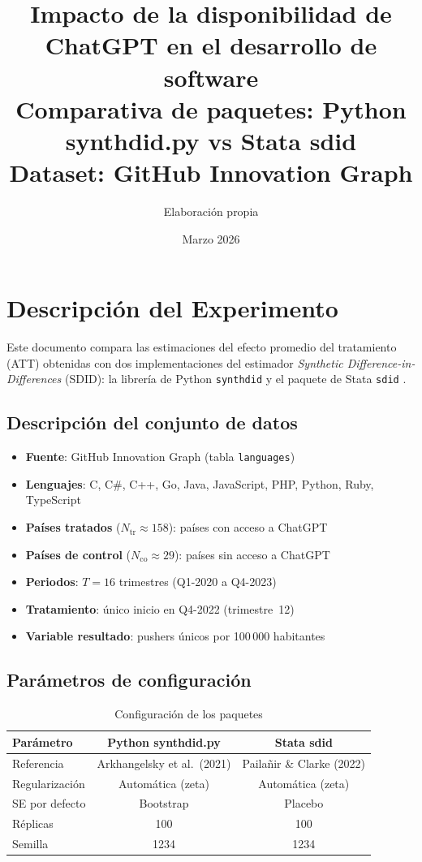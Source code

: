 \documentclass[12pt,a4paper]{article}
\title{\textbf{Impacto de la disponibilidad de ChatGPT en el desarrollo de software}\\[0.5em]
\large Comparativa de paquetes: \textcolor{pyblue}{Python synthdid.py} vs \textcolor{statagreen}{Stata sdid}\\[0.4em]
\normalsize Dataset: GitHub Innovation Graph}
\author{Elaboraci\'on propia}
\date{Marzo 2026}
\begin{document}
\maketitle
\thispagestyle{empty}
\tableofcontents
\newpage

\section{Descripci\'on del Experimento}

Este documento compara las estimaciones del efecto promedio del tratamiento (ATT)
obtenidas con dos implementaciones del estimador \textit{Synthetic Difference-in-Differences}
(SDID): la librer\'ia de Python \texttt{synthdid} \cite{clarke2023} y el paquete de Stata
\texttt{sdid} \cite{pailanir2022}.

\subsection*{Descripci\'on del conjunto de datos}
\begin{itemize}
  \item \textbf{Fuente}: GitHub Innovation Graph (tabla \texttt{languages})
  \item \textbf{Lenguajes}: C, C\#, C++, Go, Java, JavaScript, PHP, Python, Ruby, TypeScript
  \item \textbf{Pa\'ises tratados} ($N_{\mathrm{tr}} \approx 158$): pa\'ises con acceso a ChatGPT
  \item \textbf{Pa\'ises de control} ($N_{\mathrm{co}} \approx 29$): pa\'ises sin acceso a ChatGPT
  \item \textbf{Periodos}: $T = 16$ trimestres (Q1-2020 a Q4-2023)
  \item \textbf{Tratamiento}: \'unico inicio en Q4-2022 (trimestre~12)
  \item \textbf{Variable resultado}: pushers \'unicos por 100\,000 habitantes
\end{itemize}

\subsection*{Par\'ametros de configuraci\'on}
\begin{table}[htbp]\centering
\caption{Configuraci\'on de los paquetes}
\begin{tabular}{lcc}
\toprule
Par\'ametro & \textcolor{pyblue}{Python synthdid.py} & \textcolor{statagreen}{Stata sdid} \\
\midrule
Referencia & Arkhangelsky et al.\ (2021) & Pailañir \& Clarke (2022) \\
Regularizaci\'on & Autom\'atica (zeta) & Autom\'atica (zeta) \\
SE por defecto & Bootstrap & Placebo \\
R\'eplicas & 100 & 100 \\
Semilla & 1234 & 1234 \\
\bottomrule
\end{tabular}
\end{table}
\end{document}
